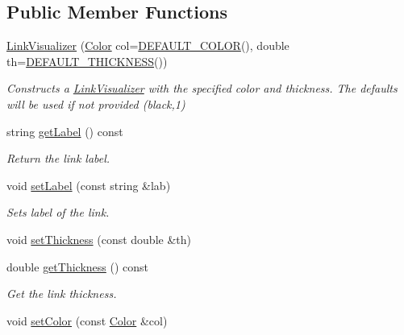 \subsection*{Public Member Functions}
\begin{DoxyCompactItemize}
\item 
\mbox{\hyperlink{classbridges_1_1datastructure_1_1_link_visualizer_ae910a1d6f13a3807b025c2c94231d7c8}{Link\+Visualizer}} (\mbox{\hyperlink{classbridges_1_1datastructure_1_1_color}{Color}} col=\mbox{\hyperlink{classbridges_1_1datastructure_1_1_link_visualizer_aa42e1a41ab0332c2e50e1a21068b2533}{D\+E\+F\+A\+U\+L\+T\+\_\+\+C\+O\+L\+OR}}(), double th=\mbox{\hyperlink{classbridges_1_1datastructure_1_1_link_visualizer_a3b23cb9f5ab2dd564fcc4d974e3753f8}{D\+E\+F\+A\+U\+L\+T\+\_\+\+T\+H\+I\+C\+K\+N\+E\+SS}}())
\begin{DoxyCompactList}\small\item\em Constructs a \mbox{\hyperlink{classbridges_1_1datastructure_1_1_link_visualizer}{Link\+Visualizer}} with the specified color and thickness. The defaults will be used if not provided (black,1) \end{DoxyCompactList}\item 
string \mbox{\hyperlink{classbridges_1_1datastructure_1_1_link_visualizer_ae25654272ef1613555c7257e5f184462}{get\+Label}} () const
\begin{DoxyCompactList}\small\item\em Return the link label. \end{DoxyCompactList}\item 
void \mbox{\hyperlink{classbridges_1_1datastructure_1_1_link_visualizer_a20ed50bf0e02f79dda0cb54c3af722fe}{set\+Label}} (const string \&lab)
\begin{DoxyCompactList}\small\item\em Sets label of the link. \end{DoxyCompactList}\item 
void \mbox{\hyperlink{classbridges_1_1datastructure_1_1_link_visualizer_acac8af8117ea32ccc1c3bf9843db9881}{set\+Thickness}} (const double \&th)
\item 
double \mbox{\hyperlink{classbridges_1_1datastructure_1_1_link_visualizer_ab8141d3139ea486fceef41df8d61291d}{get\+Thickness}} () const
\begin{DoxyCompactList}\small\item\em Get the link thickness. \end{DoxyCompactList}\item 
void \mbox{\hyperlink{classbridges_1_1datastructure_1_1_link_visualizer_aef9811c2aae77e86f601654a17ce2f87}{set\+Color}} (const \mbox{\hyperlink{classbridges_1_1datastructure_1_1_color}{Color}} \&col)

\end{DoxyCompactItemize}
